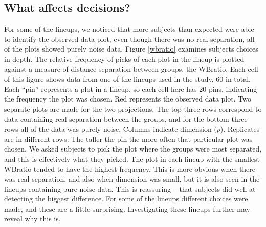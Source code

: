 
\subsection{What affects decisions?}

\normalsize

For some of the lineups, we noticed that more subjects than expected were able to identify the observed data plot, even though there was no real separation, all of the plots showed purely noise data. Figure \ref{wbratio} examines subjects choices in depth. The relative frequency of picks of each plot in the lineup is plotted against a measure of distance separation between groups, the WBratio. %
 Each cell of this figure shows data from one of the lineups used in the study, 60 in total. Each ``pin'' represents a plot in a lineup, so each cell here has 20 pins, indicating the frequency the plot was chosen. Red represents the observed data plot. Two separate plots are made for the two projections. The top three rows correspond to data containing real separation between the groups, and for the bottom three rows all of the data was purely noise. Columns indicate dimension ($p$). Replicates are in different rows. The taller the pin the more often that particular plot was chosen. We asked subjects to pick the plot where the groups were most separated, and this is effectively what they picked. The plot in each lineup with the smallest WBratio tended to have the highest frequency. This is more obvious when there was real separation, and also when dimension was small, but it is also seen in the lineups containing pure noise data. This is reassuring -- that subjects did well at detecting the biggest difference.  For some of the lineups different choices were made, and these are a little surprising. Investigating these lineups further may reveal why this is. 

